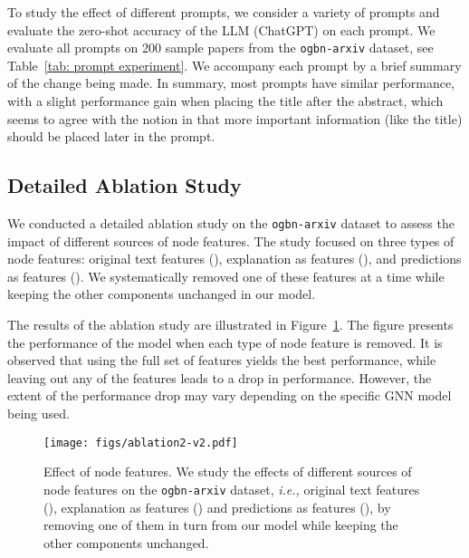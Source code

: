 \documentclass{article}
\newcommand{\ie}{\emph{i.e.,}\xspace}
\begin{document}
To study the effect of different prompts, we consider a variety of prompts and evaluate the zero-shot accuracy of the LLM (ChatGPT) on each prompt. We evaluate all prompts on 200 sample papers from the \texttt{ogbn-arxiv} dataset, see Table~\ref{tab: prompt experiment}. We accompany each prompt by a brief summary of the change being made. In summary, most prompts have similar performance, with a slight performance gain when placing the title after the abstract, which seems to agree with the notion in \cite{zhao2021calibrate} that more important information (like the title) should be placed later in the prompt.




\subsection{Detailed Ablation Study}\label{subsec: ablation2}
We conducted a detailed ablation study on the \texttt{ogbn-arxiv} dataset to assess the impact of different sources of node features. The study focused on three types of node features: original text features (), explanation as features (), and predictions as features (). We systematically removed one of these features at a time while keeping the other components unchanged in our model.

The results of the ablation study are illustrated in Figure~\ref{fig: ablation2}. The figure presents the performance of the model when each type of node feature is removed. It is observed that using the full set of features yields the best performance, while leaving out any of the features leads to a drop in performance. However, the extent of the performance drop may vary depending on the specific GNN model being used.

\begin{figure}[!ht]
    \centering
    \texttt{[image: figs/ablation2-v2.pdf]} 
    \caption{Effect of node features. We study the effects of different sources of node features on the \texttt{ogbn-arxiv} dataset, \ie original text features (), explanation as features () and predictions as features (), by removing one of them in turn from our model while keeping the other components unchanged.}
    \label{fig: ablation2}
\end{figure}
\end{document}
